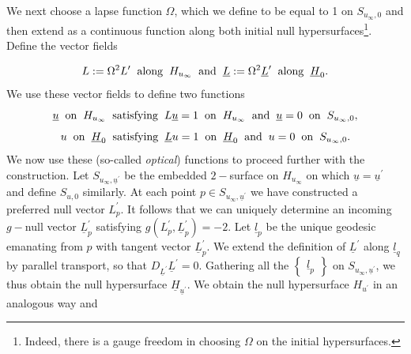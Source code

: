 \documentclass{amsart}
\newcommand{\Lbar}{\underline{L}}
\newcommand{\Hbar}{\underline{H}}
\newcommand{\ubar}{\underline{u}}
\begin{document}
	\vspace{3mm}
	\noindent We next choose a lapse function $\Omega$, which we define to be equal to 1 on $S_{u_{\infty},0}$ and then extend as a continuous function along both initial null hypersurfaces\footnote{Indeed, there is a gauge freedom in choosing $\Omega$ on the initial hypersurfaces.}. Define the vector fields
	
	\[ L := \Omega^2 L^{\prime} \hspace{2mm} \text{along}\hspace{2mm} H_{u_{\infty}} \hspace{2mm} \text{and} \hspace{2mm} \Lbar := \Omega^2 \Lbar^{\prime} \hspace{2mm} \text{along}
	\hspace{2mm} 
\Hbar_0.\]We use these vector fields to define two functions \[ \ubar \hspace{2mm} \text{on} \hspace{2mm} H_{u_{\infty}} \hspace{2mm} \text{satisfying} \hspace{2mm} L\ubar=1 \hspace{2mm} \text{on} \hspace{2mm}  H_{u_{\infty}} \hspace{2mm} \text{and} \hspace{2mm} \ubar =0 \hspace{2mm} \text{on} \hspace{2mm} S_{u_{\infty},0},\]\[ u \hspace{2mm} \text{on} \hspace{2mm} \Hbar_0 \hspace{2mm} \text{satisfying} \hspace{2mm} \Lbar u=1 \hspace{2mm} \text{on} \hspace{2mm}  \Hbar_0 \hspace{2mm} \text{and} \hspace{2mm} u =0 \hspace{2mm} \text{on} \hspace{2mm} S_{u_{\infty},0}.\]We now use these (so-called \textit{optical}) functions to proceed further with the construction. Let $S_{u_{\infty}, \ubar^{\prime}}$ be the embedded $2-$surface on $H_{u_{\infty}}$ on which $\ubar = \ubar^{\prime}$ and define $S_{u,0}$ similarly. At each point $p \in S_{u_{\infty}, \ubar^{\prime}}$ we have constructed a preferred null vector $L^{\prime}_p$. It follows that we can uniquely determine an incoming $g-$null vector $\Lbar^{\prime}_p$ satisfying $g(L^{\prime}_p, \Lbar^{\prime}_p)=-2$. Let $\underline{l}_p$ be the unique geodesic emanating from $p$ with tangent vector $\Lbar^{\prime}_p$. We extend the definition of $\Lbar^{\prime}$ along $\underline{l}_q$ by parallel transport, so that $D_{\underline{L}^{\prime}}\Lbar^{\prime}=0$. Gathering all the $\begin{Bmatrix} \underline{l}_p\end{Bmatrix}$ on $S_{u_{\infty}, \ubar^{\prime}}$, we thus obtain the null hypersurface $\Hbar_{\ubar^{\prime}}$. We obtain the null hypersurface $H_{u^{\prime}}$ in an analogous way and \]
\end{document}

